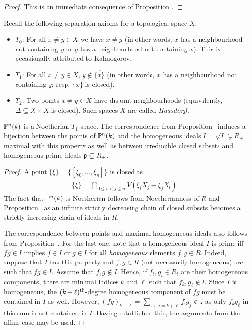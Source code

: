 \documentclass[a4paper,parskip=half,numbers=enddot, DIV=12, headheight=30pt]{scrreprt}
\begin{document}
\begin{proof}
	This is an immediate consequence of Proposition .
\end{proof}
\begin{rem*}Recall the following separation axioms for a topological space $X$:
\begin{itemize}
\item $T_0$:
For all $x\neq y\in X$ we have $\overline x\neq\overline y$ (in other words, $x$ has a neighbourhood
not containing $y$ or $y$ has a neighbourhood not containing $x$). This is occasionally attributed to Kolmogorov.
\item $T_1$: For all $x\neq y\in X$, $y\notin\overline{\{ x\}}$ (in other words, $x$ has a neighbourhood not containing $y$;
resp. $\{x\}$ is closed).
\item $T_2$: Two points $x\neq y\in X$ have disjoint neighbourhoods (equivalently, $\Delta\subseteq X\times X$ is closed). Such spaces $X$ are called \emph{Hausdorff}.
\end{itemize}
\end{rem*}
\begin{prop}
$\mathbb{P}^n(k)$ is a Noetherian $T_1$-space. The correspondence from  Proposition~ induces a bijection between the points of $\mathbb{P}^n(k)$ and the homogeneous
ideals $I=\sqrt I\subsetneq R_+$ maximal with this property as well as between irreducible closed subsets and homogeneous prime ideals $\mathfrak{p}\subsetneq R_+$.
\end{prop}
\begin{proof}
A point $\{\xi\} = \{[\xi_0,\ldots,\xi_n]\}$ is closed as 
\begin{align*}
	\{\xi\}=\bigcap_{0\leq i<j\leq n} V( \xi_i X_j - \xi_j X_i)\;.
\end{align*}
The fact that $\mathbb{P}^n(k)$ is Noetherian follows from Noetherianness of $R$ and Proposition~
as an infinite strictly decreasing chain of closed subsets becomes a strictly increasing chain of ideals in $R$.

The correspondence between points and maximal homogeneous ideals also follows from Proposition~. For the last one, note that a homogeneous ideal $I$ is prime iff $fg\in I$ implies $f\in I$ or $g\in I$ for all \emph{homogeneous} elements $f,g\in R$. Indeed, suppose that $I$ has this property and $f,g\in R$ (not necessarily homogeneous) are such that $fg\in I$. Assume that $f,g\notin I$. Hence, if $f_i,g_i\in R_i$ are their homogeneous components, there are minimal indices $k$ and $\ell$ such that $f_k,g_\ell\notin I$. Since $I$ is homogeneous, the $(k+\ell)^{\text{th}}$-degree homogeneous component of $fg$ must be contained in $I$ as well. However, $(fg)_{k+\ell}=\sum_{i+j=k+\ell}f_ig_j\notin I$ as only $f_kg_\ell$ in this sum is not contained in $I$. Having established this, the arguments from the affine case may be used.
\end{proof}
\end{document}

